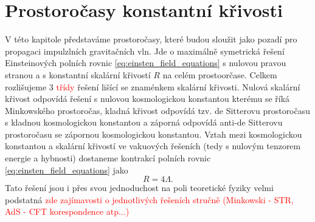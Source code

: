 \chapter{Prostoročasy konstantní křivosti}
V této kapitole představáme prostoročasy, které budou sloužit jako pozadí pro propagaci impulzlních gravitačních vln. Jde o maximálně
symetrická řešení Einsteinových polních rovnic \ref{eq:einsten_field_equations} s nulovou pravou stranou a s konstantní skalární křivostí $R$ na celém prostoorčase.
Celkem rozlišujeme 3 \textcolor{red}{třídy} řešení lišící se znaménkem skalární křivosti. Nulová skalární křivost odpovídá řešení s nulovou
kosmologickou konstantou kterému se říká Minkowského prostoročas, kladná křivost odpovídá tzv. de Sitterovu prostoročasu s kladnou kosmologickou
konstantou a záporná odpovídá anti-de Sitterovu prostoročasu se zápornou kosmologickou konstantou. Vztah mezi kosmologickou konstantou a skalární
křivostí ve vakuových řešeních (tedy s nulovým tenzorem energie a hybnosti) dostaneme kontrakcí polních rovnic \ref{eq:einsten_field_equations} jako
\begin{equation}
     R = 4 \Lambda.
\end{equation}
Tato řešení jsou i přes svou jednoduchost na poli teoretické fyziky velmi podstatná \cite{Bicak:2000ea} \textcolor{red}{zde zajímavosti
o jednotlivých řešeních stručně (Minkowski - STR, AdS - CFT korespondence atp...)}
